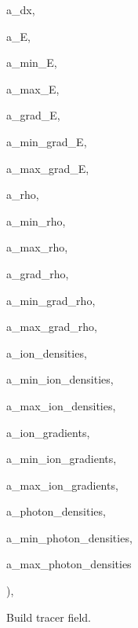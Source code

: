{\begin{DoxyParamCaption}
\item[{const Real \&}]{a\+\_\+dx, }
\item[{const Real\+Vect \&}]{a\+\_\+E, }
\item[{const Real \&}]{a\+\_\+min\+\_\+E, }
\item[{const Real \&}]{a\+\_\+max\+\_\+E, }
\item[{const Real\+Vect \&}]{a\+\_\+grad\+\_\+E, }
\item[{const Real \&}]{a\+\_\+min\+\_\+grad\+\_\+E, }
\item[{const Real \&}]{a\+\_\+max\+\_\+grad\+\_\+E, }
\item[{const Real \&}]{a\+\_\+rho, }
\item[{const Real \&}]{a\+\_\+min\+\_\+rho, }
\item[{const Real \&}]{a\+\_\+max\+\_\+rho, }
\item[{const Real\+Vect \&}]{a\+\_\+grad\+\_\+rho, }
\item[{const Real \&}]{a\+\_\+min\+\_\+grad\+\_\+rho, }
\item[{const Real \&}]{a\+\_\+max\+\_\+grad\+\_\+rho, }
\item[{const Vector$<$ Real $>$ \&}]{a\+\_\+ion\+\_\+densities, }
\item[{const Vector$<$ Real $>$ \&}]{a\+\_\+min\+\_\+ion\+\_\+densities, }
\item[{const Vector$<$ Real $>$ \&}]{a\+\_\+max\+\_\+ion\+\_\+densities, }
\item[{const Vector$<$ Real\+Vect $>$ \&}]{a\+\_\+ion\+\_\+gradients, }
\item[{const Vector$<$ Real $>$ \&}]{a\+\_\+min\+\_\+ion\+\_\+gradients, }
\item[{const Vector$<$ Real $>$ \&}]{a\+\_\+max\+\_\+ion\+\_\+gradients, }
\item[{const Vector$<$ Real $>$ \&}]{a\+\_\+photon\+\_\+densities, }
\item[{const Vector$<$ Real $>$ \&}]{a\+\_\+min\+\_\+photon\+\_\+densities, }
\item[{const Vector$<$ Real $>$ \&}]{a\+\_\+max\+\_\+photon\+\_\+densities}
\end{DoxyParamCaption}
)\hspace{0.3cm}{\ttfamily [protected]}, {}}\hypertarget{classfull__tagger_a7dfd539bf3a0eb9efb178ffb31dffafc}{}\label{classfull__tagger_a7dfd539bf3a0eb9efb178ffb31dffafc}


Build tracer field. 


